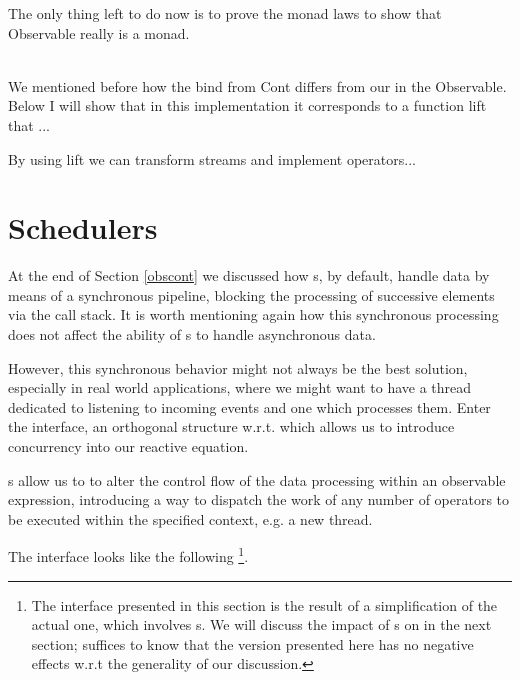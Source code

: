 The only thing left to do now is to prove the monad laws to show that Observable really is a monad.

\\

We mentioned before how the bind from Cont differs from our in the Observable. Below I will show that in this implementation it corresponds to a function lift that ... 

By using lift we can transform streams and implement operators...



\section{Schedulers}

At the end of Section \ref{obscont} we discussed how s, by default, handle data by means of a synchronous pipeline, blocking the processing of successive elements via the call stack. It is worth mentioning again how this synchronous processing does not affect the ability of s to handle asynchronous data.

However, this synchronous behavior might not always be the best solution, especially in real world applications, where we might want to have a thread dedicated to listening to incoming events and one which processes them. Enter the  interface, an orthogonal\cite{wiki:orthogonality} structure w.r.t.  which allows us to introduce concurrency into our reactive equation. 

s allow us to to alter the control flow of the data processing within an observable expression, introducing a way to dispatch the work of any number of operators to be executed within the specified context, e.g. a new thread.

The  interface looks like the following \footnote{The interface presented in this section is the result of a simplification of the actual one, which involves s. We will discuss the impact of s on  in the next section; suffices to know that the version presented here has no negative effects w.r.t the generality of our discussion.}.\\


